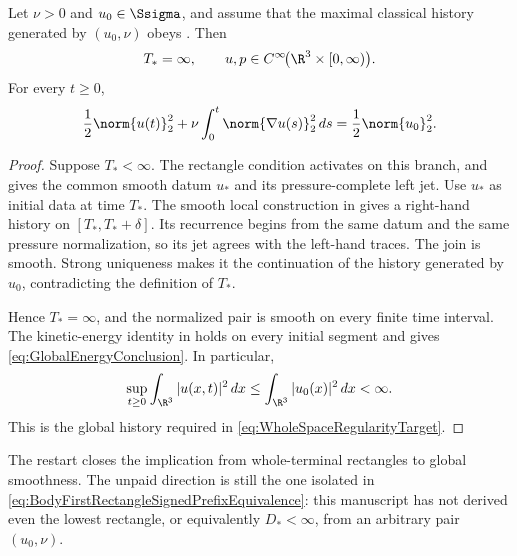 \begin{theorem}
\label{thm:MainGlobalRegularity}
Let \(\nu>0\) and \(u_0\in\Ssigma\), and assume that the maximal classical
history generated by \((u_0,\nu)\) obeys
.  Then
\begin{equation}\label{eq:BodyGlobalSmoothnessConclusion}
  T_*=\infty,
  \qquad
  u,p\in C^\infty\!\bigl(\R^3\times[0,\infty)\bigr).
\end{equation}
For every \(t\geq0\),
\begin{equation}\label{eq:GlobalEnergyConclusion}
  \frac12\norm{u(t)}_2^2
  +\nu\int_0^t\norm{\nabla u(s)}_2^2\,ds
  =\frac12\norm{u_0}_2^2.
\end{equation}
\end{theorem}

\begin{proof}
Suppose \(T_*<\infty\).  The rectangle condition activates on this branch, and
 gives the common smooth datum
\(u_*\) and its pressure-complete left jet.  Use \(u_*\) as initial data at time
\(T_*\).  The smooth local construction in  gives a
right-hand history on \([T_*,T_*+\delta]\).  Its recurrence begins from the same
datum and the same pressure normalization, so its jet agrees with the left-hand
traces.  The join is smooth.  Strong uniqueness makes it the continuation of
the history generated by \(u_0\), contradicting the definition of \(T_*\).

Hence \(T_*=\infty\), and the normalized pair is smooth on every finite time
interval.  The kinetic-energy identity in
 holds on every initial segment and
gives \eqref{eq:GlobalEnergyConclusion}.  In particular,
\[
  \sup_{t\geq0}\int_{\R^3}|u(x,t)|^2\,dx
  \leq
  \int_{\R^3}|u_0(x)|^2\,dx
  <\infty.
\]
This is the global history required in
\eqref{eq:WholeSpaceRegularityTarget}.
\end{proof}

The restart closes the implication from whole-terminal rectangles to global
smoothness.  The unpaid direction is still the one isolated in
\eqref{eq:BodyFirstRectangleSignedPrefixEquivalence}: this manuscript has not
derived even the lowest rectangle, or equivalently \(D_*<\infty\), from an
arbitrary pair \((u_0,\nu)\).
